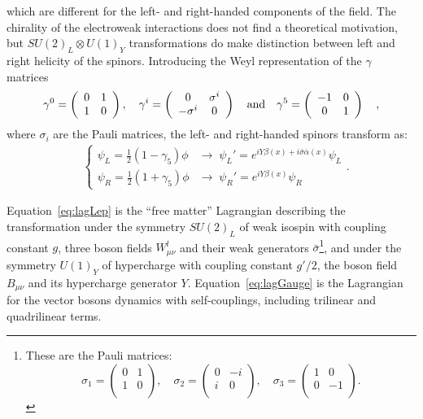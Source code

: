 which are different for the left- and
right-handed components of the field.
The chirality of the electroweak interactions does not find 
a theoretical motivation, but $SU(2)_{L} \otimes U(1)_{Y}$ transformations 
do make distinction between left and right helicity of the spinors.
Introducing the Weyl representation of the $\gamma$ matrices
\begin{equation}
\gamma^{0} = \left(\begin{array}{cc} 0 & 1 \\ 1 & 0 \\ \end{array}\right), \quad
\gamma^{i} = \left(\begin{array}{cc} 0 & \sigma^{i} \\ -\sigma^{i} & 0 \\ \end{array}\right) \quad \textnormal{and} \quad
\gamma^{5} = \left(\begin{array}{cc} -1 & 0 \\ 0 & 1 \\ \end{array}\right) \quad ,
\end{equation}
where $\sigma_{i}$ are the Pauli matrices, the left- and right-handed spinors transform as:
\begin{align}
&\left \{ \begin{array}{ll}
\psi_{L} = \frac{1}{2}(1 - \gamma_{5})\phi &\rightarrow \; \psi_{L}' = e^{iY\beta(x) + i\bar{\sigma}\bar{\alpha}(x)}\psi_{L} \\
\psi_{R} = \frac{1}{2}(1 + \gamma_{5})\phi &\rightarrow \; \psi_{R}' = e^{iY\beta(x)}\psi_{R}
\end{array} \right. .
\label{eq:chiral}
\end{align}

Equation~\ref{eq:lagLep} is the ``free matter'' Lagrangian 
describing the transformation under the symmetry $SU(2)_{L}$ of weak isospin
with coupling constant $g$, three boson fields $W^{l}_{\mu\nu}$ and
their weak generators $\bar{\sigma}$\footnote{These are the Pauli matrices: 
$$
\sigma_{1} = \left(\begin{array}{cc} 0 & 1 \\ 1 & 0 \\ \end{array}\right), \quad
\sigma_{2} = \left(\begin{array}{cc} 0 & -i \\ i & 0 \\ \end{array}\right), \quad
\sigma_{3} = \left(\begin{array}{cc} 1 & 0 \\ 0 & -1 \\ \end{array}\right).
$$}, and under the symmetry
$U(1)_{Y}$ of hypercharge with coupling constant $g'/2$,
the boson field $B_{\mu\nu}$ and its hypercharge generator $Y$.
Equation~\ref{eq:lagGauge} is the Lagrangian for the vector bosons 
dynamics with self-couplings, including trilinear and quadrilinear terms. 



